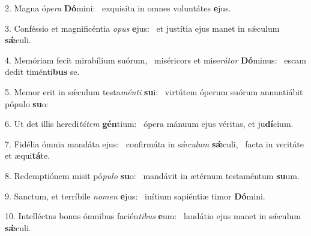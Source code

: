 2. Magna ó\textit{pe}\textit{ra} \textbf{Dó}mini: \ast\  exquisíta in omnes voluntátes \textbf{e}jus.\

3. Conféssio et magnificéntia \textit{o}\textit{pus} \textbf{e}jus: \ast\  et justítia ejus manet in sǽculum \textbf{sǽ}culi.\

4. Memóriam fecit mirabílium suórum, \dag\  miséricors et mise\textit{rá}\textit{tor} \textbf{Dó}minus: \ast\  escam dedit timénti\textbf{bus} se.\

5. Memor erit in sǽculum testa\textit{mén}\textit{ti} \textbf{su}i: \ast\  virtútem óperum suórum annuntiábit pópulo \textbf{su}o:\

6. Ut det illis heredi\textit{tá}\textit{tem} \textbf{gén}tium: \ast\  ópera mánuum ejus véritas, et ju\textbf{dí}cium.\

7. Fidélia ómnia mandáta ejus: \dag\  confirmáta in sǽ\textit{cu}\textit{lum} \textbf{sǽ}culi, \ast\  facta in veritáte et æqui\textbf{tá}te.\

8. Redemptiónem misit pó\textit{pu}\textit{lo} \textbf{su}o: \ast\  mandávit in ætérnum testaméntum \textbf{su}um.\

9. Sanctum, et terríbile \textit{no}\textit{men} \textbf{e}jus: \ast\  inítium sapiéntiæ timor \textbf{Dó}mini.\

10. Intelléctus bonus ómnibus facién\textit{ti}\textit{bus} \textbf{e}um: \ast\  laudátio ejus manet in sǽculum \textbf{sǽ}culi.\

